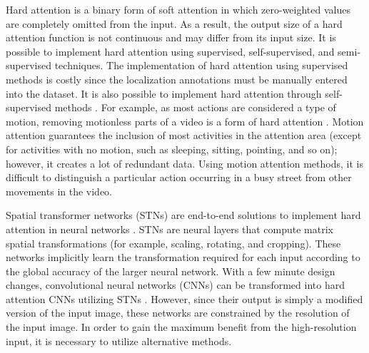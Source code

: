 \documentclass[review]{elsarticle}
\begin{document}
Hard attention is a binary form of soft attention in which zero-weighted values are completely omitted from the input. As a result, the output size of a hard attention function is not continuous and may differ from its input size. It is possible to implement hard attention using supervised, self-supervised, and semi-supervised techniques. The implementation of hard attention using supervised methods is costly since the localization annotations must be manually entered into the dataset. It is also possible to implement hard attention through self-supervised methods \citep{manchin2019reinforcement}. For example, as most actions are considered a type of motion, removing motionless parts of a video is a form of hard attention \citep{crasto2019mars}. Motion attention guarantees the inclusion of most activities in the attention area (except for activities with no motion, such as sleeping, sitting, pointing, and so on); however, it creates a lot of redundant data. Using motion attention methods, it is difficult to distinguish a particular action occurring in a busy street from other movements in the video.

Spatial transformer networks (STNs) are end-to-end solutions to implement hard attention in neural networks \citep{jaderberg2015spatial}. STNs are neural layers that compute matrix spatial transformations (for example, scaling, rotating, and cropping). These networks implicitly learn the transformation required for each input according to the global accuracy of the larger neural network. With a few minute design changes, convolutional neural networks (CNNs) can be transformed into hard attention CNNs utilizing STNs \citep{li2018harmonious, malinowski2018learning}. However, since their output is simply a modified version of the input image, these networks are constrained by the resolution of the input image. In order to gain the maximum benefit from the high-resolution input, it is necessary to utilize alternative methods.
\end{document}
